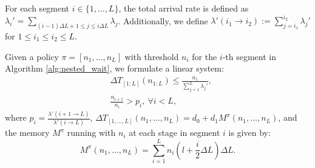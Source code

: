 \documentclass[preprint]{article}
\theoremstyle{plain}
\theoremstyle{definition}
\theoremstyle{remark}
\begin{document}
For each segment $i \in \{1, \dots, L\}$, the total arrival rate is defined as $\lambda_i' = \sum_{(i-1)\Delta L+1\le j\le i\Delta L} \lambda_j$. Additionally, we define $\lambda'(i_1 \to i_2) := \sum_{j=i_1}^{i_2} \lambda_j'$ for $1 \leq i_1 \leq i_2 \leq L$.

Given a policy $\pi=[n_1,\dots,n_L]$ with threshold $n_i$ for the $i$-th segment in Algorithm \ref{alg:nested_wait}, we formulate a linear system:
\begin{equation}          \label{eq:nested_wait_thresholds_L}
    \begin{aligned}
    &\Delta T_{[1:L]}(n_{1:L}) \leq \frac{n_1}{\sum_{j=1}^L \lambda_j'},  \\
    &\frac{n_{i+1}}{n_i} > p_i, \ \forall i < L,
    \end{aligned}
\end{equation}
where $p_i =\frac{\lambda'(i+1 \to L)}{\lambda'(i \to L)}$, $\Delta T_{[1,\dots,L]}(n_1,\dots,n_L) = d_0 + d_1 M^\pi(n_1, \dots, n_L)$, and the  memory $M^\pi$ running with $n_i$ at each stage in segment $i$ is given by:
\[
M^{\pi}(n_1, \dots, n_L) = \sum_{i=1}^L n_i \left( l + \frac{i}{2} \Delta L\right) \Delta L.
\]
\end{document}
